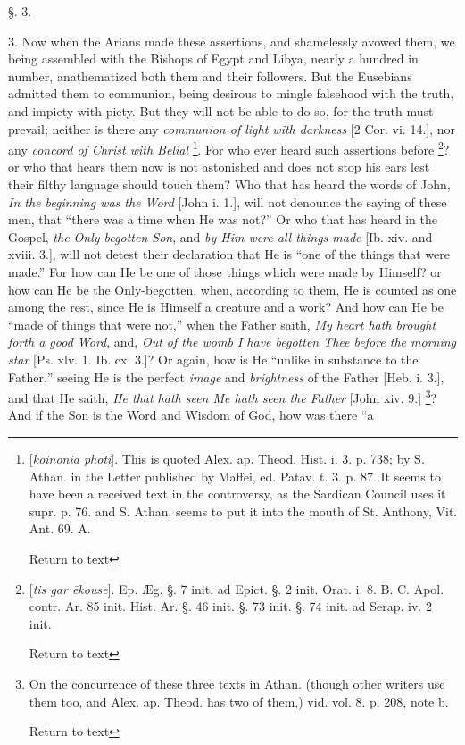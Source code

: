 §. 3.

3. Now when the Arians made these assertions, and
shamelessly avowed them, we being assembled with the Bishops of Egypt
and Libya, nearly a hundred in number, anathematized both them and
their followers. But the Eusebians admitted them to communion,
being desirous to mingle falsehood with the truth, and impiety with
piety. But they will not be able to do so, for the truth must prevail;
neither is there any \emph{communion of light with darkness} [2 Cor.
vi. 14.], nor any \emph{concord of Christ with Belial} \footnote{[\emph{koin\={o}nia ph\={o}ti}]. This is quoted Alex. ap. Theod.
Hist. i. 3. p. 738; by S. Athan. in the Letter published by Maffei,
ed. Patav. t. 3. p. 87. It seems to have been a received text in the
controversy, as the Sardican Council uses it supr. p. 76. and S. Athan.
seems to put it into the mouth of St. Anthony, Vit. Ant. 69. A.

Return to text}. For who ever heard such assertions before \footnote{[\emph{tis gar \={e}kouse}]. Ep. Æg. §. 7 init. ad Epict. §. 2
init. Orat. i. 8. B. C. Apol. contr. Ar. 85 init. Hist. Ar. §. 46
init. §. 73 init. §. 74 init. ad Serap. iv. 2 init.

Return to text}? or who that hears them now is not astonished and does not stop
his ears lest their filthy language should touch them? Who that has
heard the words of John, \emph{In the beginning was the Word} [John i.
1.], will not denounce the saying of these men, that ``there was a time
when He was not?'' Or who that has heard in the Gospel, \emph{the
Only-begotten Son}, and \emph{by Him were all things made} [Ib.
xiv. and xviii. 3.], will not detest their declaration that He is ``one
of the things that were made.'' For how can He be one of those things
which were made by Himself? or how can He be the Only-begotten, when,
according to them, He is counted as one among the rest, since He is
Himself a creature and a work? And how can He be ``made of things that
were not,'' when the Father saith, \emph{My heart hath brought forth a
good Word}, and, \emph{Out of the womb I have begotten Thee before the
morning star} [Ps. xlv. 1. Ib. cx. 3.]? Or again, how is He ``unlike
in substance to the Father,'' seeing He is the perfect \emph{image} and
\emph{brightness} of the Father [Heb. i. 3.], and that He saith, \emph{He
that hath seen Me hath seen the Father} [John xiv. 9.] \footnote{On the concurrence of these three texts in Athan. (though other
writers use them too, and Alex. ap. Theod. has two of them,) vid. vol.
8. p. 208, note b.

Return to text}? And if the Son is the Word and Wisdom of God, how was there ``a
